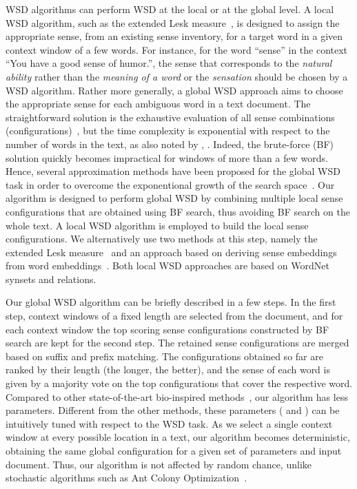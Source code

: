 \documentclass[11pt]{article}
\begin{document}
WSD algorithms can perform WSD at the local or at the global level. A local WSD algorithm, such as the extended Lesk measure~\cite{Lesk-1986,Banerjee-CICLING-2002,Banerjee-IJCAI-2003}, is designed to assign the appropriate sense, from an existing sense inventory, for a target word in a given context window of a few words. For instance, for the word ``sense'' in the context ``You have a good sense of humor.'', the sense that corresponds to the \emph{natural ability} rather than the \emph{meaning of a word} or the \emph{sensation} should be chosen by a WSD algorithm. Rather more generally, a global WSD approach aims to choose the appropriate sense for each ambiguous word in a text document. The straightforward solution is the exhaustive evaluation of all sense combinations (configurations)~\cite{Patwardhan-CICLing-2003}, but the time complexity is exponential with respect to the number of words in the text, as also noted by , . Indeed, the brute-force (BF) solution quickly becomes impractical for windows of more than a few words. Hence, several approximation methods have been proposed for the global WSD task in order to overcome the exponentional growth of the search space~\cite{Schwab-COLING-2012,Schwab-WET-2013}. Our algorithm is designed to perform global WSD by combining multiple local sense configurations that are obtained using BF search, thus avoiding BF search on the whole text. A local WSD algorithm is employed to build the local sense configurations. We alternatively use two methods at this step, namely the extended Lesk measure~\cite{Banerjee-CICLING-2002,Banerjee-IJCAI-2003} and an approach based on deriving sense embeddings from word embeddings~\cite{Bengio-JMLR-2003,Collobert-ICML-2008,Mikolov-NIPS-2013}. Both local WSD approaches are based on WordNet synsets and relations.

Our global WSD algorithm can be briefly described in a few steps. In the first step, context windows of a fixed length  are selected from the document, and for each context window the top scoring sense configurations constructed by BF search are kept for the second step. The retained sense configurations are merged based on suffix and prefix matching. The configurations obtained so far are ranked by their length (the longer, the better), and the sense of each word is given by a majority vote on the top  configurations that cover the respective word. Compared to other state-of-the-art bio-inspired methods~\cite{Schwab-COLING-2012,Schwab-WET-2013}, our algorithm has less parameters. Different from the other methods, these parameters ( and ) can be intuitively tuned with respect to the WSD task. As we select a single context window at every possible location in a text, our algorithm becomes deterministic, obtaining the same global configuration for a given set of parameters and input document. Thus, our algorithm is not affected by random chance, unlike stochastic algorithms such as Ant Colony Optimization~\cite{Lafourcade-ACO-2010,Schwab-COLING-2012,Schwab-WET-2013}.
\end{document}
